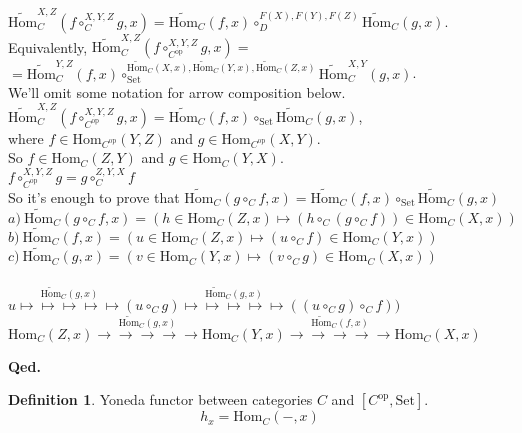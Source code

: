 \documentclass[10pt,a4paper]{article}
\theoremstyle{definition}
\newtheorem{definition}{Definition}[section]
\newcommand{\Hom}{{\textrm{Hom}}}
\newcommand{\HomMor}{{\widetilde{\Hom}\textrm{}}}
\newcommand{\op}{{\textrm{op}}}
\newcommand{\Set}{{\textrm{Set}}}
\newcommand{\myqed}{\noindent\textbf{Qed.}}
\begin{document}
\begin{enumerate}
$\HomMor_C^{X,Z}(f\circ_C^{X,Y,Z} g, x)=\HomMor_C(f,x)\circ_D^{F(X),F(Y),F(Z)} \HomMor_C(g,x)$.\\
Equivalently, $\HomMor_C^{X,Z}(f\circ_{C^\op}^{X,Y,Z} g, x)=$\\ $=\HomMor_C^{Y,Z}(f,x)\circ_\Set^{\HomMor_C(X,x),\HomMor_C(Y,x),\HomMor_C(Z,x)} \HomMor_C^{X,Y}(g,x)$.\\
We'll omit some notation for arrow composition below.\\
$\HomMor_C^{X,Z}(f\circ_{C^\op}^{X,Y,Z} g, x)=\HomMor_C(f,x)\circ_\Set \HomMor_C(g,x)$,\\
where $f\in\Hom_{C^\op}(Y,Z)$ and $g\in\Hom_{C^\op}(X,Y)$.\\
So $f\in\Hom_{C}(Z,Y)$ and $g\in\Hom_{C}(Y,X)$.\\
$f\circ_{C^\op}^{X,Y,Z} g = g\circ_{C}^{Z,Y,X} f$\\
So it's enough to prove that $\HomMor_C(g\circ_C f, x) = \HomMor_C(f, x) \circ_\Set \HomMor_C(g, x)$\\
$a)\ \HomMor_C(g\circ_C f, x) = (h \in\Hom_C(Z,x) \mapsto (h \circ_C (g\circ_C f))\in\Hom_C(X,x))$\\
$b)\ \HomMor_C(f, x) = \left(u \in\Hom_C(Z,x) \mapsto (u \circ_C f)\in\Hom_C(Y,x)\right)$\\
$c)\ \HomMor_C(g, x) = \left(v \in\Hom_C(Y,x) \mapsto (v \circ_C g)\in\Hom_C\left(X,x\right)\right)$\\
\\
$u \stackrel{\HomMor_C(g, x)}{\mapsto\mapsto\mapsto\mapsto\mapsto} (u \circ_C g)\stackrel{\HomMor_C(g, x)}{\mapsto\mapsto\mapsto\mapsto\mapsto} ((u \circ_C g) \circ_C f))$
\\
$\Hom_C(Z,x) \stackrel{\HomMor_C(g, x)}{\to\to\to\to\to} \Hom_C(Y,x)\stackrel{\HomMor_C(f, x)}{\to\to\to\to\to} \Hom_C(X,x)$
\\
\end{enumerate}
\myqed
\begin{definition}
Yoneda functor between categories $C$ and $[C^\op,\Set]$.
$$h_x = \Hom_C(-, x)$$
\end{definition}
\end{document}

